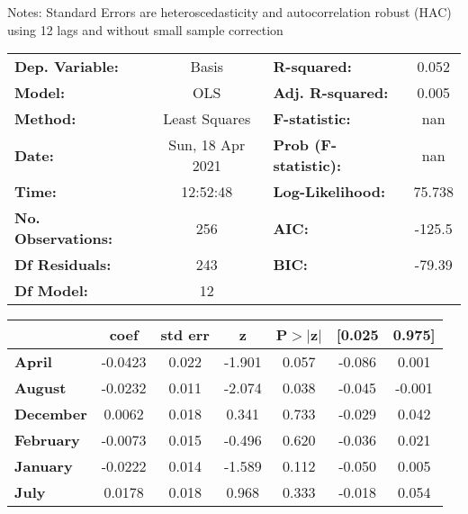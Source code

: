 Notes: \newline
 [1] Standard Errors are heteroscedasticity and autocorrelation robust (HAC) using 12 lags and without small sample correction
\begin{center}
\begin{tabular}{lclc}
\toprule
\textbf{Dep. Variable:}    &      Basis       & \textbf{  R-squared:         } &     0.052   \\
\textbf{Model:}            &       OLS        & \textbf{  Adj. R-squared:    } &     0.005   \\
\textbf{Method:}           &  Least Squares   & \textbf{  F-statistic:       } &       nan   \\
\textbf{Date:}             & Sun, 18 Apr 2021 & \textbf{  Prob (F-statistic):} &      nan    \\
\textbf{Time:}             &     12:52:48     & \textbf{  Log-Likelihood:    } &    75.738   \\
\textbf{No. Observations:} &         256      & \textbf{  AIC:               } &    -125.5   \\
\textbf{Df Residuals:}     &         243      & \textbf{  BIC:               } &    -79.39   \\
\textbf{Df Model:}         &          12      & \textbf{                     } &             \\
\bottomrule
\end{tabular}
\begin{tabular}{lcccccc}
                   & \textbf{coef} & \textbf{std err} & \textbf{z} & \textbf{P$> |$z$|$} & \textbf{[0.025} & \textbf{0.975]}  \\
\midrule
\textbf{April}     &      -0.0423  &        0.022     &    -1.901  &         0.057        &       -0.086    &        0.001     \\
\textbf{August}    &      -0.0232  &        0.011     &    -2.074  &         0.038        &       -0.045    &       -0.001     \\
\textbf{December}  &       0.0062  &        0.018     &     0.341  &         0.733        &       -0.029    &        0.042     \\
\textbf{February}  &      -0.0073  &        0.015     &    -0.496  &         0.620        &       -0.036    &        0.021     \\
\textbf{January}   &      -0.0222  &        0.014     &    -1.589  &         0.112        &       -0.050    &        0.005     \\
\textbf{July}      &       0.0178  &        0.018     &     0.968  &         0.333        &       -0.018    &        0.054     \\

\end{tabular}
\end{center}
